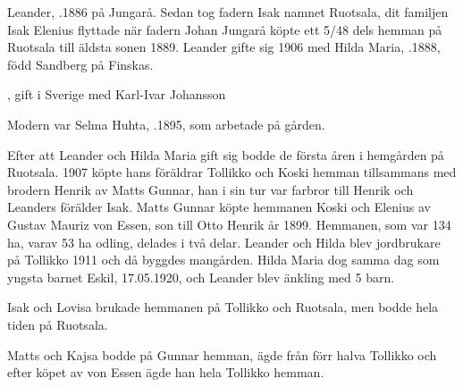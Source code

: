 %
Leander, .1886 på Jungarå. Sedan tog fadern Isak namnet Ruotsala, dit familjen Isak Elenius flyttade när fadern Johan Jungarå köpte ett 5/48 dels hemman på Ruotsala till äldsta sonen 1889. Leander gifte sig 1906 med Hilda Maria, .1888, född Sandberg på Finskas.
\begin{jhchildren}
  \item {}
  \item {}
  \item {}
  \item {}
  \item {}
  \item {}, gift i Sverige med Karl-Ivar Johansson
  \item {}
  \item {} Modern var Selma Huhta, .1895, som arbetade på gården.
\end{jhchildren}
Efter att Leander och Hilda Maria gift sig bodde de första åren i hemgården på Ruotsala. 1907 köpte hans föräldrar Tollikko och Koski hemman tillsammans med brodern Henrik av Matts Gunnar, han i sin tur var farbror till Henrik och Leanders förälder Isak. Matts Gunnar köpte hemmanen Koski och Elenius av Gustav Mauriz von Essen, son till Otto Henrik år 1899. Hemmanen, som var 134 ha, varav 53 ha odling, delades i två delar. Leander och Hilda blev jordbrukare på Tollikko 	1911 och då byggdes mangården. Hilda Maria dog samma dag som yngsta barnet Eskil, 17.05.1920, och Leander blev änkling med 5 barn.


%
Isak och Lovisa brukade hemmanen på Tollikko och Ruotsala, men bodde hela tiden på Ruotsala.


%
Matts och Kajsa bodde på Gunnar hemman, ägde från förr halva Tollikko och efter köpet av von Essen ägde han hela Tollikko hemman.


